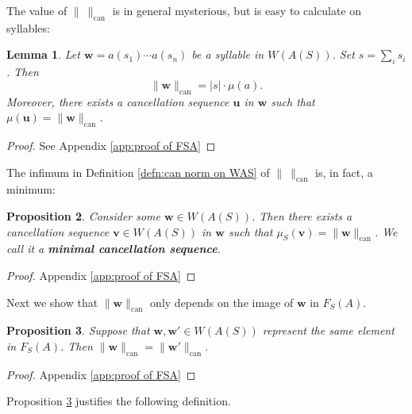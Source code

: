 \documentclass[12pt]{amsart}
\newtheorem{prop}{Proposition}[section]
\newtheorem{lemma}[prop]{Lemma}
\theoremstyle{definition}
\newcommand{\B}[1]{\mathbf{#1}}
\def\can{\text{can}}
\def\Free{F}
\begin{document}
The value of $\| \ \|_{\can}$ is in general mysterious, but is easy to calculate on syllables:



\begin{lemma}\label{lem:minimal cancellation seq in syllable}
Let $\B w = a(s_1) \cdots a(s_n)$ be a syllable in $W(A(S))$.
Set $s= \sum_i s_i$.
Then 
\[
\| \B w \|_{\can} = |s | \cdot \mu(a).
\]
Moreover, there exists a cancellation sequence $\B u$ in $\B w$ such that $\mu(\B u) =\| \B w\|_{\can}$.
\end{lemma}


\begin{proof}
See Appendix \ref{app:proof of FSA}
\end{proof}







The infimum in Definition \ref{defn:can norm on WAS} of $\| \ \|_{\can}$ is, in fact, a minimum:


\begin{prop}\label{prop:can-WAS minimum cancellation sequence}
Consider some $\B w \in W(A(S))$.
Then there exists a cancellation sequence $\B v \in W(A(S))$ in $\B w$ such that $\mu_S(\B v)=\| \B w\|_{\can}$.
We call it a {\bf minimal cancellation sequence}.
\end{prop}

\begin{proof}
Appendix \ref{app:proof of FSA}
\end{proof}







Next we show that  $\| \B w \|_{\can}$ only depends on the image of $\B w$ in $\Free_S(A)$.



\begin{prop}\label{prop:can-norm invariant representatives}
Suppose that $\B w, \B w' \in W(A(S))$ represent the same element in $\Free_S(A)$.
Then $\| \B w\|_{\can}=\| \B w'\|_{\can}$.
\end{prop}


\begin{proof}
Appendix \ref{app:proof of FSA}
\end{proof}


Proposition \ref{prop:can-norm invariant representatives} justifies the following definition.
\end{document}
